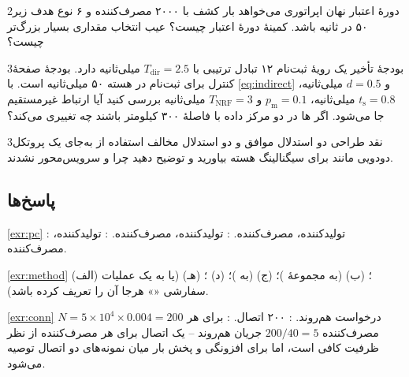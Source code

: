 \documentclass[11pt,a4paper]{article}
\begin{document}
\begin{exercisebox}{2}{دورهٔ اعتبار نهان}\label{exr:validity}
اپراتوری می‌خواهد بار کشف  با ۲۰۰۰ مصرف‌کننده و ۶ نوع هدف زیر ۵۰ در ثانیه باشد. کمینهٔ دورهٔ اعتبار چیست؟ عیب انتخاب
مقداری بسیار بزرگ‌تر چیست؟
\end{exercisebox}

\begin{exercisebox}{3}{بودجهٔ تأخیر}\label{exr:budget}
یک رویهٔ ثبت‌نام ۱۲ تبادل ترتیبی  با $T_{\mathrm{dir}} = 2.5$ میلی‌ثانیه دارد. بودجهٔ صفحهٔ کنترل برای ثبت‌نام در هسته ۵۰
میلی‌ثانیه است. با \cref{eq:indirect} و $d = 0.5$ میلی‌ثانیه، $t_{\mathrm{s}} = 0.8$ میلی‌ثانیه، $p_{\mathrm{m}} = 0.1$ و
$T_{\mathrm{NRF}} = 3$ میلی‌ثانیه بررسی کنید آیا ارتباط غیرمستقیم جا می‌شود. اگر ها در دو مرکز داده با فاصلهٔ ۳۰۰ کیلومتر
باشند چه تغییری می‌کند؟
\end{exercisebox}

\begin{exercisebox}{3}{نقد طراحی}\label{exr:critique}
دو استدلال موافق و دو استدلال مخالف استفاده از  به‌جای یک پروتکل دودویی مانند  برای سیگنالینگ
هسته بیاورید و توضیح دهید چرا  و  سرویس‌محور نشدند.
\end{exercisebox}

\subsection*{پاسخ‌ها}

\begin{solutionbox}{\ref{exr:pc}}
:  تولیدکننده،  مصرف‌کننده. :  تولیدکننده،  مصرف‌کننده.
:  تولیدکننده،  مصرف‌کننده.
\end{solutionbox}

\begin{solutionbox}{\ref{exr:method}}
(الف) ؛ (ب)  (به مجموعهٔ )؛ (ج)  (به )؛ (د) ؛ (هـ)
 (یا  به یک عملیات سفارشی «» هرجا  آن را تعریف کرده باشد).
\end{solutionbox}

\begin{solutionbox}{\ref{exr:conn}}
$N = 5\times10^4\times0.004 = 200$ درخواست هم‌روند. : ۲۰۰ اتصال. : برای هر مصرف‌کننده $200/40 = 5$ جریان
هم‌روند -- یک اتصال برای هر مصرف‌کننده از نظر ظرفیت کافی است، اما برای افزونگی و پخش بار میان نمونه‌های  دو اتصال
توصیه می‌شود.
\end{solutionbox}
\end{document}
